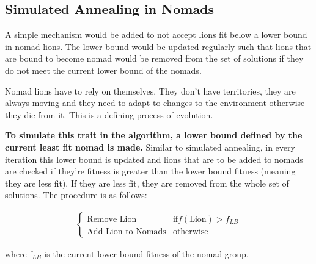 \subsection{Simulated Annealing in Nomads}
\par A simple mechanism would be added to not accept lions fit below a lower bound in nomad lions. The lower bound would be updated regularly such that lions that are bound to become nomad would be removed from the set of solutions if they do not meet the current lower bound of the nomads.

\par Nomad lions have to rely on themselves. They don't have territories, they are always moving and they need to adapt to changes to the environment otherwise they die from it. This is a defining process of evolution. \cite{evo}

\par \textbf{To simulate this trait in the algorithm, a lower bound defined by the current least fit nomad is made.} Similar to simulated annealing, in every iteration this lower bound is updated and lions that are to be added to nomads are checked if they're fitness is greater than the lower bound fitness (meaning they are less fit). \cite{sa} If they are less fit, they are removed from the whole set of solutions. The procedure is as follows:

\begin{align*}
\begin{cases}
   \text{Remove Lion}        & \text{if} f(\text{Lion})  > f_{LB} \\
   \text{Add Lion to Nomads}        & \text{otherwise}
\end{cases}
\end{align*}

where f$_{LB}$ is the current lower bound fitness of the nomad group.

